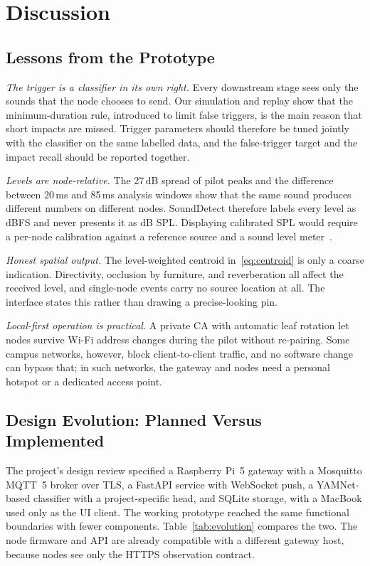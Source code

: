 \documentclass[conference]{IEEEtran}
\newcommand{\ms}{\,ms}
\begin{document}
\section{Discussion}
\label{sec:discussion}

\subsection{Lessons from the Prototype}
\emph{The trigger is a classifier in its own right.} Every downstream stage sees only the sounds that the node chooses to send. Our simulation and replay show that the minimum-duration rule, introduced to limit false triggers, is the main reason that short impacts are missed. Trigger parameters should therefore be tuned jointly with the classifier on the same labelled data, and the false-trigger target and the impact recall should be reported together.

\emph{Levels are node-relative.} The 27\,dB spread of pilot peaks and the difference between 20\ms{} and 85\ms{} analysis windows show that the same sound produces different numbers on different nodes. SoundDetect therefore labels every level as dBFS and never presents it as dB SPL. Displaying calibrated SPL would require a per-node calibration against a reference source and a sound level meter~\cite{iec61672}.

\emph{Honest spatial output.} The level-weighted centroid in~\eqref{eq:centroid} is only a coarse indication. Directivity, occlusion by furniture, and reverberation all affect the received level, and single-node events carry no source location at all. The interface states this rather than drawing a precise-looking pin.

\emph{Local-first operation is practical.} A private CA with automatic leaf rotation let nodes survive Wi-Fi address changes during the pilot without re-pairing. Some campus networks, however, block client-to-client traffic, and no software change can bypass that; in such networks, the gateway and nodes need a personal hotspot or a dedicated access point.

\subsection{Design Evolution: Planned Versus Implemented}
The project's design review specified a Raspberry Pi~5 gateway with a Mosquitto MQTT~5 broker over TLS, a FastAPI service with WebSocket push, a YAMNet-based classifier with a project-specific head, and SQLite storage, with a MacBook used only as the UI client. The working prototype reached the same functional boundaries with fewer components. Table~\ref{tab:evolution} compares the two. The node firmware and API are already compatible with a different gateway host, because nodes see only the HTTPS observation contract.
\end{document}
